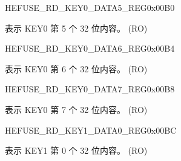 \begin{register}{H}{EFUSE\_RD\_KEY0\_DATA5\_REG}{0x{}00B0}\label{regdesc:EFUSERDKEY0DATA5REG}
%
\regnewline%
\begin{regdesc}\begin{reglist}
\label{fielddesc:EFUSEKEY0DATA5}\item [EFUSE\_KEY0\_DATA5] 表示 KEY0 第 5 个 32 位内容。 (RO)
\end{reglist}\end{regdesc}
\end{register}


\begin{register}{H}{EFUSE\_RD\_KEY0\_DATA6\_REG}{0x{}00B4}\label{regdesc:EFUSERDKEY0DATA6REG}
%
\regnewline%
\begin{regdesc}\begin{reglist}
\label{fielddesc:EFUSEKEY0DATA6}\item [EFUSE\_KEY0\_DATA6] 表示 KEY0 第 6 个 32 位内容。 (RO)
\end{reglist}\end{regdesc}
\end{register}


\begin{register}{H}{EFUSE\_RD\_KEY0\_DATA7\_REG}{0x{}00B8}\label{regdesc:EFUSERDKEY0DATA7REG}
%
\regnewline%
\begin{regdesc}\begin{reglist}
\label{fielddesc:EFUSEKEY0DATA7}\item [EFUSE\_KEY0\_DATA7] 表示 KEY0 第 7 个 32 位内容。 (RO)
\end{reglist}\end{regdesc}
\end{register}


\begin{register}{H}{EFUSE\_RD\_KEY1\_DATA0\_REG}{0x{}00BC}\label{regdesc:EFUSERDKEY1DATA0REG}
%
\regnewline%
\begin{regdesc}\begin{reglist}
\label{fielddesc:EFUSEKEY1DATA0}\item [EFUSE\_KEY1\_DATA0] 表示 KEY1 第 0 个 32 位内容。 (RO)
\end{reglist}\end{regdesc}
\end{register}


